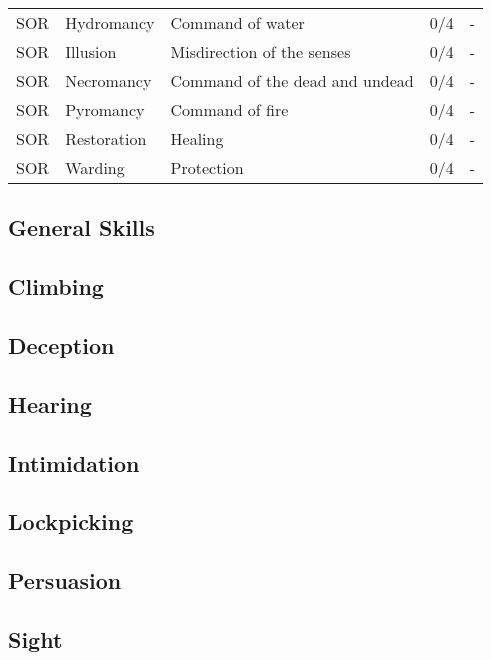 \begin{center}
\begin{xltabular}{\textwidth}{l l X l l}
        SOR & Hydromancy & Command of water & 0/4 & - \\
        SOR & Illusion & Misdirection of the senses & 0/4 & - \\
        SOR & Necromancy & Command of the dead and undead & 0/4 & - \\
        SOR & Pyromancy & Command of fire & 0/4 & - \\
        SOR & Restoration & Healing & 0/4 & - \\
        SOR & Warding & Protection & 0/4 & - \\
    \end{xltabular}
\end{center}

\begin{multicols*}{2}

    \section{General Skills}

    \subsection*{Climbing}\label{skill:climbing}

    \subsection*{Deception}\label{skill:deception}

    \subsection*{Hearing}\label{skill:hearing}

    \subsection*{Intimidation}\label{skill:intimidation}

    \subsection*{Lockpicking}\label{skill:lockpicking}

    \subsection*{Persuasion}\label{skill:persuasion}

    \subsection*{Sight}\label{skill:sight}


\end{multicols*}
